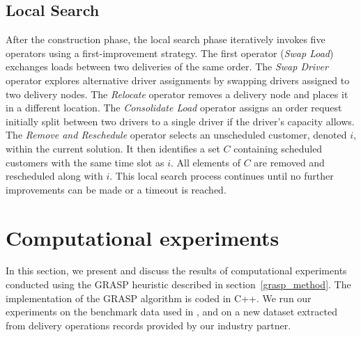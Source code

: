 \documentclass{article}
\begin{document}
\subsection{Local Search}

After the construction phase, the local search phase iteratively invokes five operators using a first-improvement strategy. The first operator (\textit{Swap Load}) exchanges loads between two deliveries of the same order. The \textit{Swap Driver} operator explores alternative driver assignments by swapping drivers assigned to two delivery nodes. The \textit{Relocate} operator removes a delivery node and places it in a different location. The \textit{Consolidate Load} operator assigns an order request initially split between two drivers to a single driver if the driver's capacity allows. The \textit{Remove and Reschedule} operator selects an unscheduled customer, denoted $i$, within the current solution. It then identifies a set $C$ containing scheduled customers with the same time slot as $i$. All elements of $C$ are removed and rescheduled along with $i$. This local search process continues until no further improvements can be made or a timeout is reached.




\section{Computational experiments}
\label{comp_exp}

In this section, we present and discuss the results of computational experiments conducted using the GRASP heuristic described in section~\ref{grasp_method}. The implementation of the GRASP algorithm is coded in C++. We run our experiments on the benchmark data used in \cite{kinable2014concrete}, and on a new dataset extracted from delivery operations records provided by our industry partner.
\end{document}
